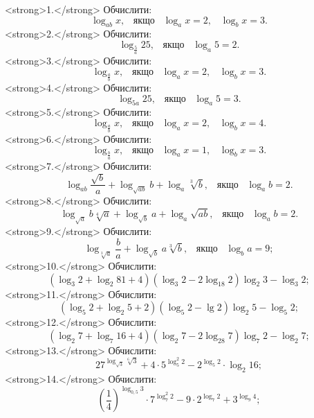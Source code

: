 <strong>1.</strong> Обчислити:
$$\log_{ab}x, \;\;\; \mbox{якщо} \;\;\; \log_{a}x=2, \;\;\; \log_{b}x=3.$$
<strong>2.</strong> Обчислити:
$$\log_{\frac{5}{a}}25, \;\;\; \mbox{якщо} \;\;\; \log_{a}5=2.$$
<strong>3.</strong> Обчислити:
$$\log_{\frac{a}{b}}x, \;\;\; \mbox{якщо} \;\;\; \log_{a}x=2, \;\;\; \log_{b}x=3.$$
<strong>4.</strong> Обчислити:
$$\log_{5a}25, \;\;\; \mbox{якщо} \;\;\; \log_{a}5=3.$$
<strong>5.</strong> Обчислити:
$$\log_{\frac{a}{b}}x, \;\;\; \mbox{якщо} \;\;\; \log_{a}x=2, \;\;\; \log_{b}x=4.$$
<strong>6.</strong> Обчислити:
$$\log_{\frac{b}{a}}x, \;\;\; \mbox{якщо} \;\;\; \log_{a}x=1, \;\;\; \log_{b}x=3.$$
<strong>7.</strong> Обчислити:
$$\log_{ab}\dfrac{\sqrt{b}}{a}+\log_{\sqrt{ab}}b+\log_{a}\sqrt[3]{b}, \;\;\; \mbox{якщо} \;\;\; \log_{a}b=2.$$
<strong>8.</strong> Обчислити:
$$\log_{\sqrt{a}}b\sqrt[4]{a}+\log_{\sqrt{b}}a+\log_{a}\sqrt{ab}, \;\;\; \mbox{якщо} \;\;\; \log_{a}b=2.$$
<strong>9.</strong> Обчислити:
$$\log_{\sqrt[3]{a}}\dfrac{b}{a}+\log_{\sqrt{b}}a\sqrt[3]{b}, \;\;\; \mbox{якщо} \;\;\; \log_{b}a=9;$$
<strong>10.</strong> Обчислити:
$$\left(\log_3 2 + \log_2 81 + 4\right)\left(\log_3 2 - 2\log_{18} 2\right)\log_2 3 - \log_3 2;$$
<strong>11.</strong> Обчислити:
$$\left(\log_{5}2+\log_{2}5+2\right)\left(\log_{5}2-\lg2\right)\log_{2}5-\log_{5}2;$$
<strong>12.</strong> Обчислити:
$$\left(\log_{2}7+\log_{7}16+4\right)\left(\log_{2}7-2\log_{28}7\right)\log_{7}2-\log_{2}7;$$
<strong>13.</strong> Обчислити:
$$27^{\log_{\sqrt{3}}\sqrt[6]{3}}+4\cdot5^{\log^{2}_{5}2}-2^{\log_{5}2}\cdot\log_{2}16;$$
<strong>14.</strong> Обчислити:
$$\left(\dfrac{1}{4}\right)^{\log_{0,5}3}\cdot7^{\log^{2}_{7}2}-9\cdot2^{\log_{7}2}+3^{\log_{9}4};$$
